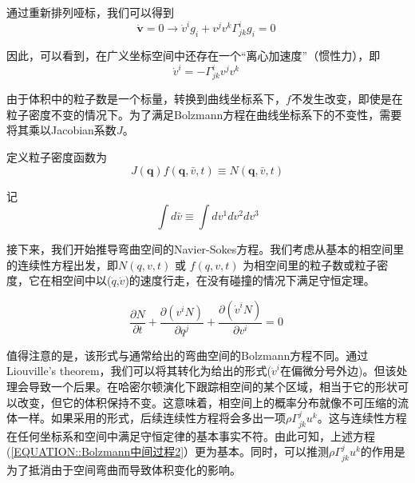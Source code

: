 \documentclass[LBMDerivation.tex]{subfiles}
\begin{document}
通过重新排列哑标，我们可以得到
\begin{equation}
  \dot{\boldsymbol{v}}=0 \rightarrow \dot{v}^{i} g_{i}+v^{j} v^{k} \Gamma_{j k}^{i} g_{i}=0
  \label{EQUATION::A.5} ~
\end{equation}
%
%

因此，可以看到，在广义坐标空间中还存在一个“离心加速度”（惯性力），即
%
%
\begin{equation}
  \dot{v}^{i}=- \Gamma_{j k}^{i}v^{j} v^{k}
  \label{EQUATION::A.6} ~
\end{equation}

由于体积中的粒子数是一个标量，转换到曲线坐标系下，$f$不发生改变，即使是在粒子密度不变的情况下。为了满足Bolzmann方程在曲线坐标系下的不变性，需要将其乘以Jacobian系数$J$。

定义粒子密度函数为
\begin{equation}
  J(\boldsymbol{q}) f(\boldsymbol{q}, \bar{v}, t) \equiv N(\boldsymbol{q}, \bar{v}, t)
\end{equation}

记
\begin{equation}
  \int d \bar{v} \equiv \int d v^{1} d v^{2} d v^{3}
\end{equation}




接下来，我们开始推导弯曲空间的Navier-Sokes方程。我们考虑从基本的相空间里的连续性方程出发，即$N(q,v,t)$ 或 $f(q,v,t)$ 为相空间里的粒子数或粒子密度，它在相空间中以($\dot{q}$,$\dot{v}$)的速度行走，在没有碰撞的情况下满足守恒定理。





\begin{equation}
  \frac{\partial N}{\partial t}+\frac{\partial (v^i N)}{\partial q^{j}} +  \frac{\partial (\dot{v}^{i} N)}{\partial  v^{i}} =0
  \label{EQUATION::Bolzmann中间过程2} ~
\end{equation}

%

值得注意的是，该形式与通常给出的弯曲空间的Bolzmann方程不同。通过Liouville’s theorem，我们可以将其转化为\cite{mendoza2013flow}给出的形式($\dot{v}^i$在偏微分号外边)。但该处理会导致一个后果。在哈密尔顿演化下跟踪相空间的某个区域，相当于它的形状可以改变，但它的体积保持不变。这意味着，相空间上的概率分布就像不可压缩的流体一样。如果采用\cite{mendoza2013flow}的形式，后续连续性方程将会多出一项$\rho  \Gamma_{jk}^j u^k$。这与连续性方程在任何坐标系和空间中满足守恒定律的基本事实不符。由此可知，上述方程(\ref{EQUATION::Bolzmann中间过程2}）更为基本。同时，可以推测$\rho  \Gamma_{jk}^j u^k$的作用是为了抵消由于空间弯曲而导致体积变化的影响。
%
\end{document}
